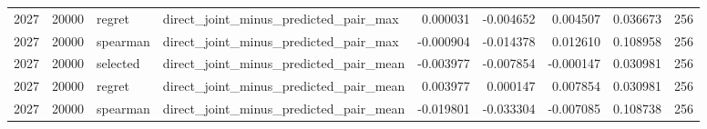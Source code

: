 \begin{tabular}{rrllrrrrr}
2027 & 20000 & regret & direct_joint_minus_predicted_pair_max & 0.000031 & -0.004652 & 0.004507 & 0.036673 & 256 \\
2027 & 20000 & spearman & direct_joint_minus_predicted_pair_max & -0.000904 & -0.014378 & 0.012610 & 0.108958 & 256 \\
2027 & 20000 & selected & direct_joint_minus_predicted_pair_mean & -0.003977 & -0.007854 & -0.000147 & 0.030981 & 256 \\
2027 & 20000 & regret & direct_joint_minus_predicted_pair_mean & 0.003977 & 0.000147 & 0.007854 & 0.030981 & 256 \\
2027 & 20000 & spearman & direct_joint_minus_predicted_pair_mean & -0.019801 & -0.033304 & -0.007085 & 0.108738 & 256 \\
\bottomrule
\end{tabular}
